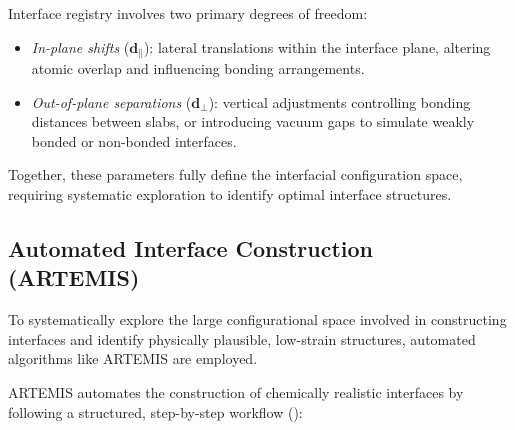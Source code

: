 
Interface registry involves two primary degrees of freedom:


\begin{itemize}
    \item \textit{In-plane shifts} (\(\mathbf{d}_{\parallel}\)): lateral translations within the interface plane,
    altering atomic overlap and influencing bonding arrangements.
    \item \textit{Out-of-plane separations} (\(\mathbf{d}_{\perp}\)): vertical adjustments controlling bonding distances
    between slabs, or introducing vacuum gaps to simulate weakly bonded or non-bonded interfaces.
\end{itemize}


Together, these parameters fully define the interfacial configuration space, requiring systematic exploration to
identify optimal interface structures.


\subsection{Automated Interface Construction (ARTEMIS)}


To systematically explore the large configurational space involved in constructing interfaces and identify physically
plausible, low-strain structures, automated algorithms like ARTEMIS are employed\cite{artemis_paper}.

ARTEMIS automates the construction of chemically realistic interfaces by following a structured, step-by-step workflow
():


